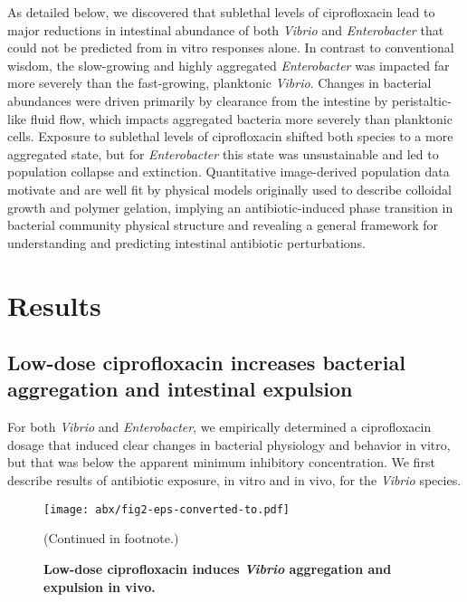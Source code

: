 As detailed below, we discovered that sublethal levels of ciprofloxacin lead to major reductions in intestinal abundance of both \textit{Vibrio} and \textit{Enterobacter} that could not be predicted from in vitro responses alone. In contrast to conventional wisdom, the slow-growing and highly aggregated \textit{Enterobacter} was impacted far more severely than the fast-growing, planktonic \textit{Vibrio}. Changes in bacterial abundances were driven primarily by clearance from the intestine by peristaltic-like fluid flow, which impacts aggregated bacteria more severely than planktonic cells. Exposure to sublethal levels of ciprofloxacin shifted both species to a more aggregated state, but for \textit{Enterobacter} this state was unsustainable and led to population collapse and extinction. Quantitative image-derived population data motivate and are well fit by physical models originally used to describe colloidal growth and polymer gelation, implying an antibiotic-induced phase transition in bacterial community physical structure and revealing a general framework for understanding and predicting intestinal antibiotic perturbations.









 \section{Results}

 \subsection{Low-dose ciprofloxacin increases bacterial aggregation and intestinal expulsion}

For both \textit{Vibrio} and \textit{Enterobacter}, we empirically determined a ciprofloxacin dosage that induced clear changes in bacterial physiology and behavior in vitro, but that was below the apparent minimum inhibitory concentration. We first describe results of antibiotic exposure, in vitro and in vivo, for the \textit{Vibrio} species. 



\begin{figure}%
	\centerline{
		\texttt{[image: abx/fig2-eps-converted-to.pdf]}}
		\caption{\textbf{Low-dose ciprofloxacin induces \textit{Vibrio} aggregation and expulsion in vivo.}}{(Continued in footnote.)}
		\label{fig:fig2}
\end{figure}



